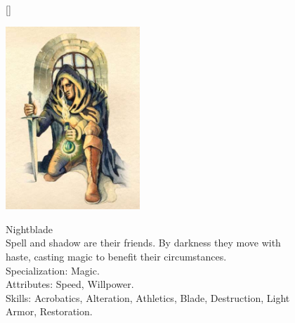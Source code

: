 \documentclass[12pt]{book}
\begin{document}
\begin{figure}[H]
[\FBwidth]
{\caption*{Nightblade\\

Spell and shadow are their friends. By darkness they move with haste, casting magic to benefit their circumstances.\\

Specialization: Magic.\\

Attributes: Speed, Willpower.\\

Skills: Acrobatics, Alteration, Athletics, Blade, Destruction, Light Armor, Restoration.}\label{fig:test}}
{\includegraphics[width=0.45\textwidth]{Nightblade.png}}
\end{figure}
\end{document}
